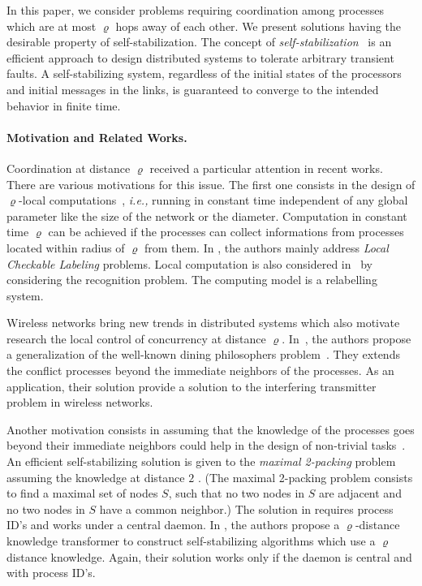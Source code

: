 \documentclass[11pt]{article}
\newcommand{\ie}{\emph{i.e., }}
\begin{document}
In this paper, we consider problems requiring coordination among processes which are 
at most $\varrho$ hops away of each other. We present solutions having the desirable property of 
self-stabilization.  The concept of {\em self-stabilization}~\cite{D74,D00} is an efficient 
approach to design distributed systems to tolerate arbitrary transient faults. A
self-stabilizing system, regardless of the initial states of the processors
and initial messages in the links, is guaranteed to converge to the intended
behavior in finite time.

\paragraph{Motivation and Related Works.}

Coordination at distance $\varrho$ received a particular attention in recent works.  
There are various motivations for this issue.  The first one consists in the design of $\varrho$-local
computations~\cite{NS93}, \ie running in constant time independent of any global parameter like 
the size of the network or the diameter.  Computation in constant time $\varrho$ can be achieved if the processes
can collect informations from processes located within radius of $\varrho$ from them. 
In \cite{NS93}, the authors mainly address \emph{Local Checkable Labeling} problems. 
Local computation is also considered in~\cite{GMM04} by considering the recognition problem.  
The computing model is a relabelling system.  


Wireless networks bring new trends in distributed systems which also motivate research the local control 
of concurrency at distance $\varrho$.  In~\cite{DNT06}, the authors propose a generalization of the 
well-known dining philosophers problem~\cite{Dij68}.  They extends the conflict processes beyond the 
immediate neighbors of the processes.  As an application, their solution provide a solution
to the interfering transmitter problem in wireless networks.

Another motivation consists in assuming that the knowledge of the processes goes beyond their immediate neighbors 
could help in the design of non-trivial tasks~\cite{GGHK04,GHJT06}. 
An efficient self-stabilizing solution is given to the \emph{maximal 2-packing} problem assuming
the knowledge at distance $2$ \cite{GGHK04}. (The maximal 2-packing problem consists to find a 
maximal set of nodes $S$, such that no two nodes in $S$ are adjacent and no two nodes in $S$ have a common neighbor.)
The solution in \cite{GGHK04} requires process ID's and works under a central daemon.  
In \cite{GHJT06}, the authors propose a $\varrho$-distance knowledge transformer to
construct self-stabilizing algorithms which use a $\varrho$ distance 
knowledge. Again, their solution works only if the daemon is central and with process ID's.  
\end{document}

